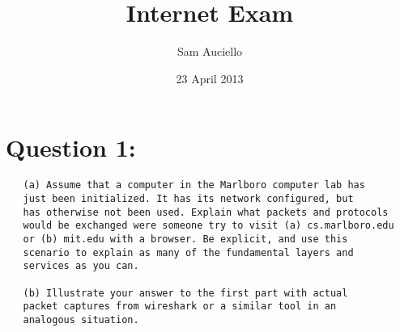 \documentclass[11pt]{article}
\title{Internet Exam}
\author{Sam Auciello}
\date{23 April 2013}
\begin{document}
\maketitle




\section*{Question 1:}
\label{sec-1}

  
\begin{verbatim}
   (a) Assume that a computer in the Marlboro computer lab has
   just been initialized. It has its network configured, but 
   has otherwise not been used. Explain what packets and protocols
   would be exchanged were someone try to visit (a) cs.marlboro.edu
   or (b) mit.edu with a browser. Be explicit, and use this 
   scenario to explain as many of the fundamental layers and 
   services as you can.
   
   (b) Illustrate your answer to the first part with actual 
   packet captures from wireshark or a similar tool in an
   analogous situation.
\end{verbatim}
\end{document}
